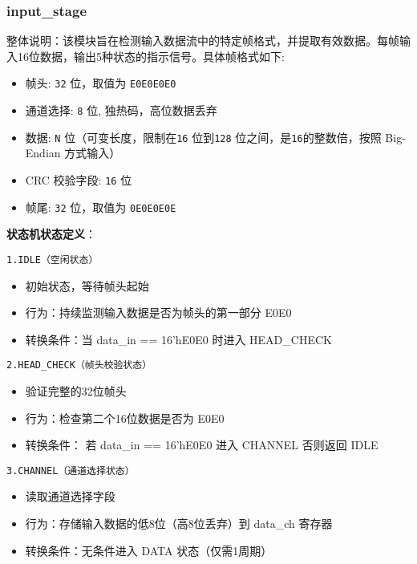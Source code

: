 \documentclass[12pt,]{article}
\begin{document}
\hypertarget{input_stage}{%
\subsubsection{input\_stage}\label{input_stage}}

整体说明：该模块旨在检测输入数据流中的特定帧格式，并提取有效数据。每帧输入16位数据，输出5种状态的指示信号。具体帧格式如下:

\begin{itemize}
\item
  帧头: \texttt{32} 位，取值为 \texttt{E0E0E0E0}
\item
  通道选择: \texttt{8} 位, 独热码，高位数据丢弃
\item
  数据: \texttt{N} 位（可变长度，限制在\texttt{16} 位到\texttt{128}
  位之间，是\texttt{16}的整数倍，按照 Big-Endian 方式输入）
\item
  CRC 校验字段: \texttt{16} 位
\item
  帧尾: \texttt{32} 位，取值为 \texttt{0E0E0E0E}
\end{itemize}

\textbf{状态机状态定义}：

\texttt{1.\hspace{0pt}IDLE\hspace{0pt}（空闲状态）}

\begin{itemize}
\item
  初始状态，等待帧头起始
\item
  行为：持续监测输入数据是否为帧头的第一部分 E0E0
\item
  转换条件：当 data\_in == 16'hE0E0 时进入 HEAD\_CHECK
\end{itemize}

\texttt{2.HEAD\_CHECK\hspace{0pt}（帧头校验状态）}

\begin{itemize}
\item
  验证完整的32位帧头
\item
  行为：检查第二个16位数据是否为 E0E0
\item
  转换条件： 若 data\_in == 16'hE0E0 进入 CHANNEL 否则返回 IDLE
\end{itemize}

\texttt{3.\hspace{0pt}CHANNEL\hspace{0pt}（通道选择状态）}

\begin{itemize}
\item
  读取通道选择字段
\item
  行为：存储输入数据的低8位（高8位丢弃）到 data\_ch 寄存器
\item
  转换条件：无条件进入 DATA 状态（仅需1周期）
\end{itemize}
\end{document}
